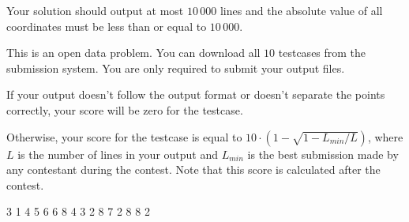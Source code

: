 Your solution should output at most $10\,000$ lines and the absolute value of all coordinates must be less than or equal to $10\,000$.

This is an open data problem. You can download all $10$ testcases from the submission system. You are only required to submit your output files.

If your output doesn't follow the output format or doesn't separate the points correctly, your score will be zero for the testcase.

Otherwise, your score for the testcase is equal to
$ 10 \cdot \left(1 - \sqrt{1 - L_{min} / L}\right)$,
where $L$ is the number of lines in your output and $L_{min}$ is the best submission made by any contestant during the contest.
Note that this score is calculated after the contest.


3 1
4 5
6 6
8 4
3 2 8 7
2 8 8 2
\sampleEND


